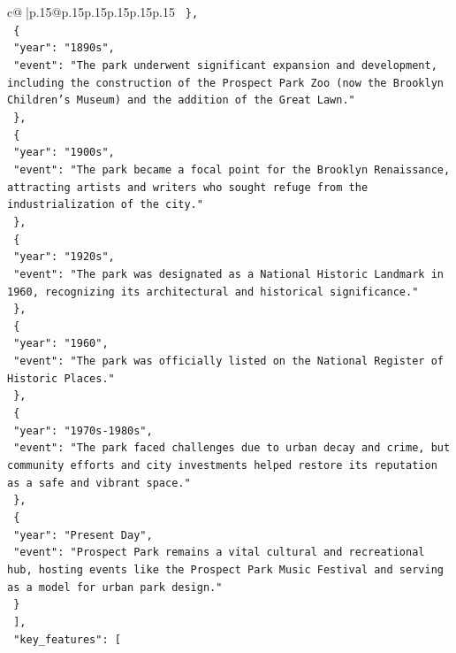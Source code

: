 \documentclass{article}
\begin{document}
{\begin{supertabular}{c@{$\;$}|p{.15\linewidth}@{}p{.15\linewidth}p{.15\linewidth}p{.15\linewidth}p{.15\linewidth}p{.15\linewidth}}
{{{\texttt{    \},} \\
\texttt{    \{} \\
\texttt{      "year": "1890s",} \\
\texttt{      "event": "The park underwent significant expansion and development, including the construction of the Prospect Park Zoo (now the Brooklyn Children's Museum) and the addition of the Great Lawn."} \\
\texttt{    \},} \\
\texttt{    \{} \\
\texttt{      "year": "1900s",} \\
\texttt{      "event": "The park became a focal point for the Brooklyn Renaissance, attracting artists and writers who sought refuge from the industrialization of the city."} \\
\texttt{    \},} \\
\texttt{    \{} \\
\texttt{      "year": "1920s",} \\
\texttt{      "event": "The park was designated as a National Historic Landmark in 1960, recognizing its architectural and historical significance."} \\
\texttt{    \},} \\
\texttt{    \{} \\
\texttt{      "year": "1960",} \\
\texttt{      "event": "The park was officially listed on the National Register of Historic Places."} \\
\texttt{    \},} \\
\texttt{    \{} \\
\texttt{      "year": "1970s{-}1980s",} \\
\texttt{      "event": "The park faced challenges due to urban decay and crime, but community efforts and city investments helped restore its reputation as a safe and vibrant space."} \\
\texttt{    \},} \\
\texttt{    \{} \\
\texttt{      "year": "Present Day",} \\
\texttt{      "event": "Prospect Park remains a vital cultural and recreational hub, hosting events like the Prospect Park Music Festival and serving as a model for urban park design."} \\
\texttt{    \}} \\
\texttt{  {]},} \\
\texttt{  "key\_features": {[}} \\
}}}
\end{supertabular}}
\end{document}
